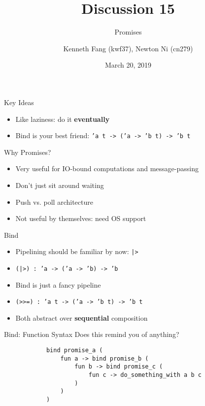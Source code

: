 \documentclass{beamer}
\title{Discussion 15}
\subtitle{Promises}
\author{Kenneth Fang (kwf37), Newton Ni (cn279)}
\date{March 20, 2019}
\newcommand{\code}[1]{\texttt{#1}}
\begin{document}
    \begin{frame}
        \titlepage{}
    \end{frame}

    \begin{frame}{Key Ideas}
        \begin{itemize}
            \item<1-> Like laziness: do it \textbf{eventually}
            \item<2-> Bind is your best friend: \code{'a t -> ('a -> 'b t) -> 'b t}
        \end{itemize}
    \end{frame}

    \begin{frame}{Why Promises?}
        \begin{itemize}
            \item<1-> Very useful for IO-bound computations and message-passing
            \item<2-> Don't just sit around waiting
            \item<3-> Push vs. poll architecture
            \item<4-> Not useful by themselves: need OS support
        \end{itemize}
    \end{frame}

    \begin{frame}{Bind}
        \begin{itemize}
            \item<1-> Pipelining should be familiar by now: \code{|>}
            \item<2-> \code{(|>) : 'a -> ('a -> 'b) -> 'b}
            \item<3-> Bind is just a fancy pipeline
            \item<4-> \code{(>>=) : 'a t -> ('a -> 'b t) -> 'b t}
            \item<5-> Both abstract over \textbf{sequential} composition
        \end{itemize}
    \end{frame}

    \begin{frame}[fragile=singleslide]{Bind: Function Syntax}
        Does this remind you of anything?

        \begin{verbatim}
            bind promise_a (
                fun a -> bind promise_b (
                    fun b -> bind promise_c (
                        fun c -> do_something_with a b c
                    )
                )
            )
        \end{verbatim}
    \end{frame}
\end{document}
